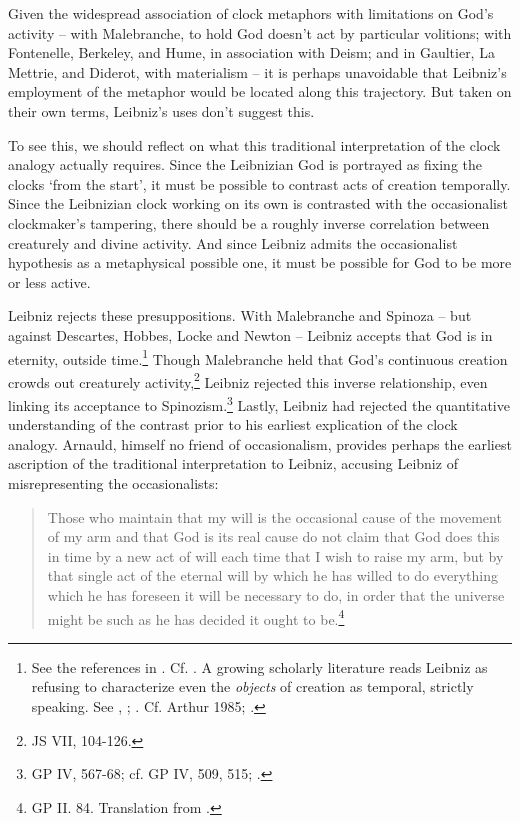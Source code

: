 \documentclass{article}
\begin{document}
Given the widespread association of clock metaphors with limitations on
God's activity -- with Malebranche, to hold God doesn't act by
particular volitions; with Fontenelle, Berkeley, and Hume, in
association with Deism; and in Gaultier, La Mettrie, and Diderot, with
materialism -- it is perhaps unavoidable that Leibniz's employment of
the metaphor would be located along this trajectory. But taken on their
own terms, Leibniz's uses don't suggest this.

To see this, we should reflect on what this traditional interpretation
of the clock analogy actually requires. Since the Leibnizian God is
portrayed as fixing the clocks `from the start', it must be possible to
contrast acts of creation temporally. Since the Leibnizian clock working
on its own is contrasted with the occasionalist clockmaker's tampering,
there should be a roughly inverse correlation between creaturely and
divine activity. And since Leibniz admits the occasionalist hypothesis
as a metaphysical possible one, it must be possible for God to be more
or less active.

Leibniz rejects these presuppositions. With Malebranche and Spinoza --
but against Descartes, Hobbes, Locke and Newton -- Leibniz accepts that
God is in eternity, outside time.\footnote{See the references in \autocite[414]{Gorham2008}. Cf. \autocite[250]{Jolley2002}. A growing scholarly literature reads
  Leibniz as refusing to characterize even the \emph{objects} of
  creation as temporal, strictly speaking. See \autocite{Whipple2010}, \autocite{Whipple2011}; \autocite{Uchii2015}. Cf. Arthur 1985; \autocite{Lloyd2008}.} Though Malebranche held that
God's continuous creation crowds out creaturely activity,\footnote{JS
  VII, 104-126.} Leibniz rejected this inverse relationship, even
linking its acceptance to Spinozism.\footnote{GP IV, 567-68; cf. GP IV,
  509, 515; \autocite[318-320]{Bobro2008}.} Lastly, Leibniz had rejected the
quantitative understanding of the contrast prior to his earliest
explication of the clock analogy. Arnauld, himself no friend of
occasionalism, provides perhaps the earliest ascription of the
traditional interpretation to Leibniz, accusing Leibniz of
misrepresenting the occasionalists:

\begin{quote}
Those who maintain that my will is the occasional cause of the movement
of my arm and that God is its real cause do not claim that God does this
in time by a new act of will each time that I wish to raise my arm, but
by that single act of the eternal will by which he has willed to do
everything which he has foreseen it will be necessary to do, in order
that the universe might be such as he has decided it ought to
be.\footnote{GP II. 84. Translation from \autocite[246]{Jolley2002}.}
\end{quote}
\end{document}
